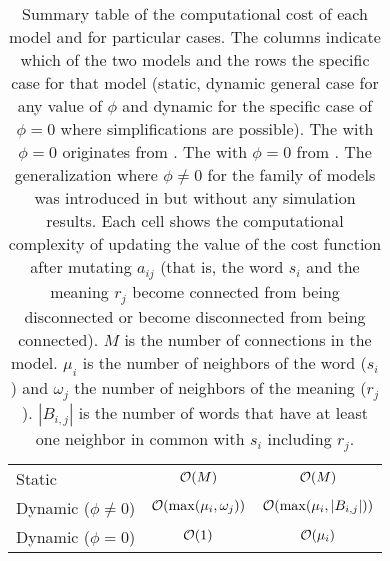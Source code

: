 \begin{table}
  \centering
  \begin{adjustbox}{max width=\textwidth}
    \begin{tabular}{lcc}
      \toprule
                             & \Firstmodel{} & \Secondmodel{} \\
      \midrule
      Static                 & $\mathcal{O}(M)$                    & $\mathcal{O}(M)$                   \\
      Dynamic ($\phi\neq 0$) & $\mathcal{O}(\max(\mu_i,\omega_j))$ & $\mathcal{O}(\max(\mu_i,|B_{i,j}|))$ \\
      Dynamic ($\phi=0$)     & $\mathcal{O}(1)$                   & $\mathcal{O}(\mu_i)$                \\
      \bottomrule
    \end{tabular}
  \end{adjustbox}
    \caption{
      Summary table of the computational cost of each model and for particular cases.
      The columns indicate which of the two models and the rows the specific case for that model (static, dynamic general case for any value of $\phi$ and dynamic for the specific case of $\phi=0$ where simplifications are possible).
      The \firstmodel{} with $\phi=0$ originates from \cite{Ferrer2005a}.
      The \secondmodel{} with $\phi=0$ from \cite{Ferrer2003a}.
      The generalization where $\phi \neq 0$ for the family of models was introduced in \cite{Ferrer2018a} but without any simulation results.
      Each cell shows the computational complexity of updating the value of the cost function after mutating $a_{ij}$ (that is, the word $s_i$ and the meaning $r_j$ become connected from being disconnected or become disconnected from being connected).
      $M$ is the number of connections in the model.
      $\mu_i$ is the number of neighbors of the word ($s_i$) and $\omega_j$ the number of neighbors of the meaning ($r_j$).
      $|B_{i,j}|$ is the number of words that have at least one neighbor in common with $s_i$ including $r_j$.
    }
  \label{tab:summary-computational}
\end{table}

